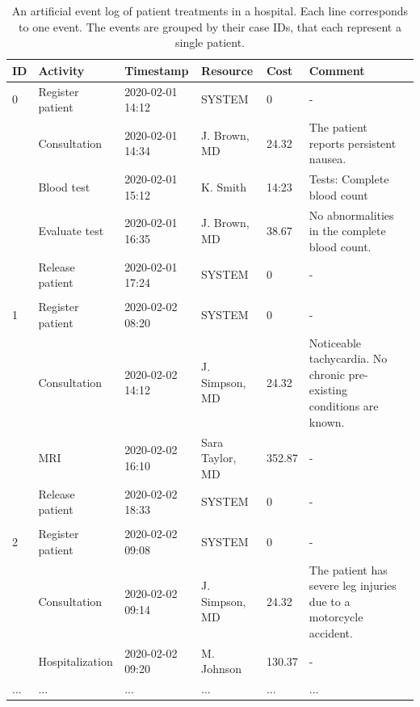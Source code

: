 \begin{table}[htbp!]
	\small
	\setlength\tabcolsep{3pt}
	\begin{tabularx}{\textwidth}{lllllp{4.7cm}l}
		\toprule
		\textbf{ID} & \textbf{Activity}          & \textbf{Timestamp} & \textbf{Resource} & \textbf{Cost} & \textbf{Comment}  \\
		\midrule
		0                & Register patient           & 2020-02-01 14:12   & SYSTEM            & 0             & -     \\
		& Consultation               & 2020-02-01 14:34   & J. Brown, MD    & 24.32         & The patient reports persistent nausea.   \\
		& Blood test                 & 2020-02-01 15:12   & K. Smith         & 14:23         & Tests: Complete blood count    \\
		& Evaluate test  & 2020-02-01 16:35   & J. Brown, MD    & 38.67         &No abnormalities in the complete blood count.   \\
		& Release patient            & 2020-02-01 17:24   & SYSTEM            & 0             & -  \\
		&                            &                    &                   &               &     \\
		\midrule
		1                & Register patient           & 2020-02-02 08:20   & SYSTEM            & 0             & -  \\
		& Consultation               & 2020-02-02 14:12   & J. Simpson, MD  & 24.32         & Noticeable tachycardia. No chronic pre-existing conditions are known.    \\
		& MRI & 2020-02-02 16:10   & Sara Taylor, MD   & 352.87        & -    \\
		& Release patient            & 2020-02-02 18:33   & SYSTEM            & 0             & -   \\
		&                            &                    &                   &               &     \\
		\midrule
		2                & Register patient           & 2020-02-02 09:08   & SYSTEM            & 0             & -    \\
		& Consultation               & 2020-02-02 09:14   & J. Simpson, MD  & 24.32         & The patient has severe leg injuries due to a motorcycle accident.  \\
		& Hospitalization       & 2020-02-02 09:20   & M. Johnson      & 130.37        & -     \\
		...              & ...                        & ...                & ...               & ...           & ...     \\ \bottomrule
	\end{tabularx}
	\caption[Artificial event log of patient treatments in a hospital]{An artificial event log of patient treatments in a hospital. Each line corresponds to one event. The events are grouped by their case IDs, that each represent a single patient.}
	\label{tab:event-log}
\end{table}

